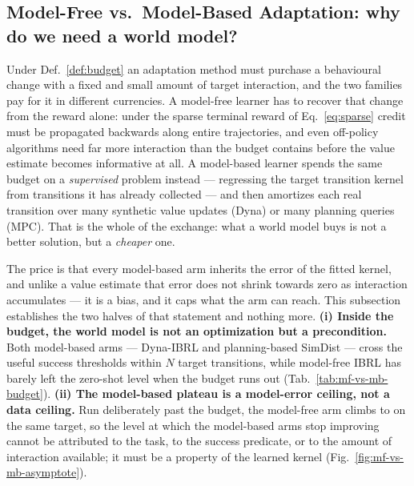 
\subsection{Model-Free vs.\ Model-Based Adaptation: why do we need a world model?}
\label{sec:mf-vs-mb}

Under Def.~\ref{def:budget} an adaptation method must purchase a behavioural
change with a fixed and small amount of target interaction, and the two families
pay for it in different currencies. A model-free learner has to recover that
change from the reward alone: under the sparse terminal reward of
Eq.~\ref{eq:sparse} credit must be propagated backwards along entire
trajectories, and even off-policy algorithms need far more interaction than the
budget contains before the value estimate becomes informative at all. A
model-based learner spends the same budget on a \emph{supervised} problem
instead --- regressing the target transition kernel from transitions it has
already collected --- and then amortizes each real transition over many
synthetic value updates (Dyna) or many planning queries (MPC). That is the whole
of the exchange: what a world model buys is not a better solution, but a
\emph{cheaper} one.

The price is that every model-based arm inherits the error of the fitted kernel,
and unlike a value estimate that error does not shrink towards zero as
interaction accumulates --- it is a bias, and it caps what the arm can reach.
This subsection establishes the two halves of that statement and nothing more.
\textbf{(i) Inside the budget, the world model is not an optimization but a
precondition.} Both model-based arms --- Dyna-IBRL and planning-based SimDist
--- cross the useful success thresholds within $N$ target transitions, while
model-free IBRL has barely left the zero-shot level when the budget runs out
(Tab.~\ref{tab:mf-vs-mb-budget}). \textbf{(ii) The model-based plateau is a
model-error ceiling, not a data ceiling.} Run deliberately past the budget, the
model-free arm climbs to  on the same target, so the level at which the
model-based arms stop improving cannot be attributed to the task, to the success
predicate, or to the amount of interaction available; it must be a property of
the learned kernel (Fig.~\ref{fig:mf-vs-mb-asymptote}).

